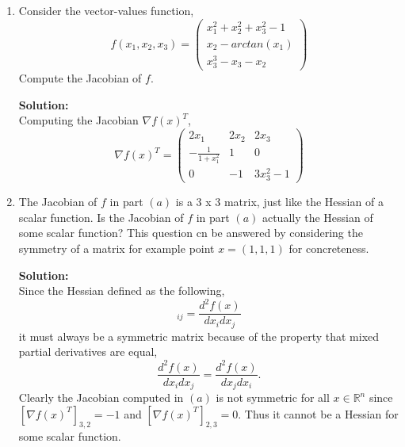 \documentclass[12pt]{article}
\makeatletter
\theoremstyle{homework}
\newenvironment{exercise}[1]
{\def\@currentlabel{#1}\exercisecore}
{\endexercisecore}
\newcommand{\localhead}[1]{\par\smallskip\noindent\textbf{#1}\nobreak\\}%
\newcommand\solution{\localhead{Solution:}}
\newcommand{\Reals}{\ensuremath{\mathbb R}}
\let\RR\Reals
\makeatother
\begin{document}
\begin{exercise}{P7}
  \begin{enumerate}
    \item[a.] Consider the vector-values function, 
    \begin{equation*}
      f(x_1, x_2, x_3) = \begin{pmatrix}
        x_1^2 + x_2^2 + x_3^2 - 1\\
        x_2 - arctan(x_1)\\
        x_3^3 - x_3 - x_2
      \end{pmatrix}
    \end{equation*}
    Compute the Jacobian of $f$. \\
    \solution Computing the Jacobian $\nabla f(x)^T$, 
    \begin{equation*}
      \nabla f(x)^T = 
      \begin{pmatrix}
        2x_1 & 2x_2 & 2x_3 \\
         -\frac{1}{1 + x_1^2} & 1 & 0\\
          0 & -1&  3x_3^2 - 1        
      \end{pmatrix}
    \end{equation*}
    \vspace{.15in}

    \item[b.] The Jacobian of $f$ in part $(a)$ is a 3 x 3 matrix, just like the Hessian of a scalar function. 
    Is the Jacobian of $f$ in part $(a)$ actually the Hessian of some scalar function? This question cn be answered by considering the
    symmetry of a matrix for example point $x = (1, 1, 1)$ for concreteness. \\
    \solution Since the Hessian defined as the following, 
    \begin{equation*}
      [\lambda^2f(x)]_{ij} = \frac{d^2f(x)}{dx_i dx_j}
    \end{equation*}
    it must always be a symmetric matrix because of the property that mixed partial derivatives are equal, 
    \begin{equation*}
      \frac{d^2f(x)}{dx_i dx_j} = \frac{d^2f(x)}{dx_j dx_i}.
    \end{equation*}
    Clearly the Jacobian computed in $(a)$ is not symmetric for all $x \in \RR^n$ since $[\nabla f(x)^T]_{3,2} = -1$ and $[\nabla f(x)^T]_{2,3} = 0$. Thus 
    it cannot be a Hessian for some scalar function. 






  \end{enumerate}
\end{exercise}
\vspace*{.15in}
\end{document}
